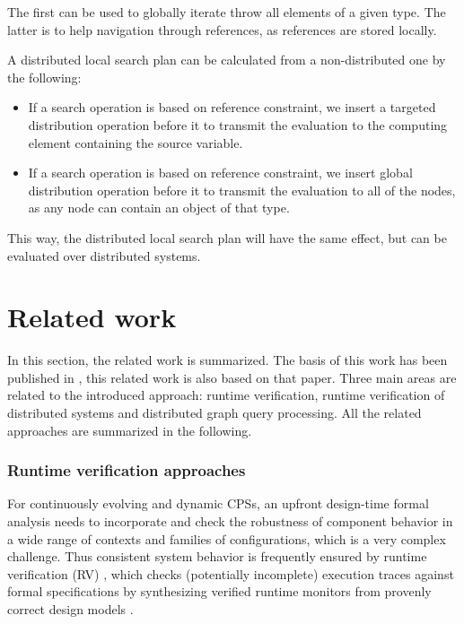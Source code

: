 The first can be used to globally iterate throw all elements of a given type. 
The latter is to help navigation through references, as references are stored locally.

A distributed local search plan can be calculated from a non-distributed one by the following:
\begin{itemize}
	\item If a search operation is based on reference constraint, we insert a targeted distribution operation before it to transmit the evaluation to the computing element containing the source variable.
	\item If a search operation is based on reference constraint, we insert global distribution operation before it to transmit the evaluation to all of the nodes, as any node can contain an object of that type.
\end{itemize}

This way, the distributed local search plan will have the same effect, but can be evaluated over distributed systems.


\section{Related work}

\newcommand{\mrt}{models\-@ run\-time\space}

In this section, the related work is summarized. The basis of this work has been published in \cite{FASE}, this related work is also based on that paper. Three main areas are related to the introduced approach: runtime verification, runtime verification of distributed systems and distributed graph query processing. All the related approaches are summarized in the following.

\subsubsection{Runtime verification approaches}
For continuously evolving and dynamic CPSs, an upfront design-time formal analysis needs to incorporate and check the robustness of component behavior in a wide range of contexts and families of configurations, %
which is a very complex challenge. Thus consistent system behavior is frequently ensured by runtime verification (RV) \cite{Leucker2009}, which checks (potentially incomplete) execution traces against formal specifications by synthesizing verified runtime monitors from provenly correct design models \cite{Mitsch2014,Joshi2017}.

